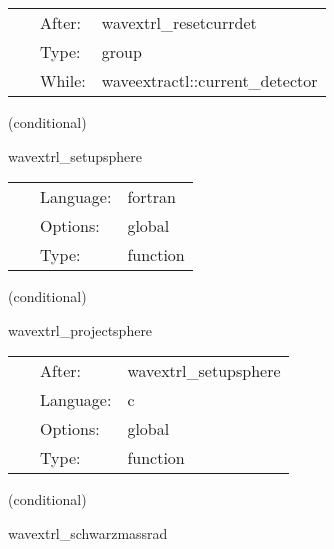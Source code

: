 \documentclass{article}
\begin{document}
 \begin{tabular*}{160mm}{cll} 
~ & After:  & wavextrl\_resetcurrdet \\ 
~ & Type:  & group \\ 
~ & While:  & waveextractl::current\_detector \\ 
\end{tabular*} 


\vspace{5mm}

   (conditional) 

\hspace{5mm} wavextrl\_setupsphere 

\hspace{5mm}{\it setup sintheta, sinphi arrays } 


\hspace{5mm}

 \begin{tabular*}{160mm}{cll} 
~ & Language:  & fortran \\ 
~ & Options:  & global \\ 
~ & Type:  & function \\ 
\end{tabular*} 


\vspace{5mm}

   (conditional) 

\hspace{5mm} wavextrl\_projectsphere 

\hspace{5mm}{\it interpolate 3d quantities into 2d grid arrays (on the sphere), project onto sphere } 


\hspace{5mm}

 \begin{tabular*}{160mm}{cll} 
~ & After:  & wavextrl\_setupsphere \\ 
~ & Language:  & c \\ 
~ & Options:  & global \\ 
~ & Type:  & function \\ 
\end{tabular*} 


\vspace{5mm}

   (conditional) 

\hspace{5mm} wavextrl\_schwarzmassrad 
\end{document}
